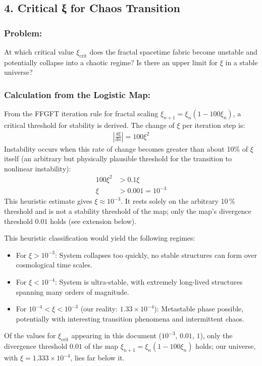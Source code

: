 	\subsection*{4. Critical ξ for Chaos Transition}
	
	\subsubsection*{Problem:}
	At which critical value $\xi_{\text{crit}}$ does the fractal spacetime fabric become unstable and potentially collapse into a chaotic regime? Is there an upper limit for $\xi$ in a stable universe?
	
	\subsubsection*{Calculation from the Logistic Map:}
	
	From the FFGFT iteration rule for fractal scaling $\xi_{n+1} = \xi_n (1 - 100\xi_n)$, a critical threshold for stability is derived. The change of $\xi$ per iteration step is:
	\begin{align*}
		\left|\frac{d\xi}{dn}\right| = 100\xi^2
	\end{align*}
	Instability occurs when this rate of change becomes greater than about 10\% of $\xi$ itself (an arbitrary but physically plausible threshold for the transition to nonlinear instability):
	\begin{align*}
		100\xi^2 &> 0.1\xi \\
		\xi &> 0.001 = 10^{-3}
	\end{align*}
	This heuristic estimate gives $\xi \approx 10^{-3}$. It rests solely on the arbitrary 10\,\% threshold and is not a stability threshold of the map; only the map's divergence threshold $0.01$ holds (see extension below).
	
	This heuristic classification would yield the following regimes:
	\begin{itemize}
		\item For $\xi > 10^{-3}$: System collapses too quickly, no stable structures can form over cosmological time scales.
		\item For $\xi < 10^{-4}$: System is ultra-stable, with extremely long-lived structures spanning many orders of magnitude.
		\item For $10^{-4} < \xi < 10^{-3}$ (our reality: $1.33\times10^{-4}$): Metastable phase possible, potentially with interesting transition phenomena and intermittent chaos.
	\end{itemize}
	Of the values for $\xi_{\text{crit}}$ appearing in this document ($10^{-3}$, $0.01$, $1$), only the divergence threshold $0.01$ of the map $\xi_{n+1} = \xi_n(1-100\xi_n)$ holds; our universe, with $\xi = 1.333\times10^{-4}$, lies far below it.
	
